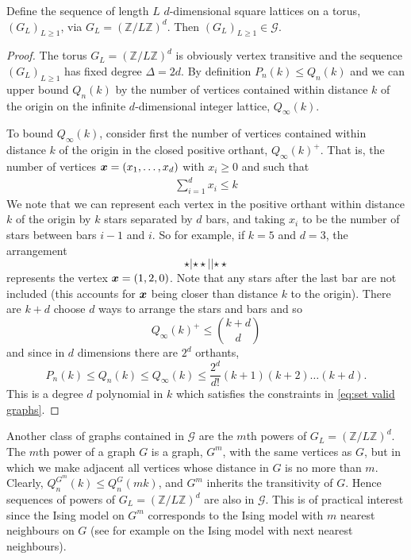 \begin{lemma}
	Define the sequence of length $L$ $d$-dimensional square lattices on a torus, $(G_L)_{L \geq 1}$, via $G_L = (\mathbb{Z}/L \mathbb{Z})^d$. Then $(G_L)_{L \geq 1} \in \mathscr{G}$.
\end{lemma}
\begin{proof}
	The torus $G_L = (\mathbb{Z}/L \mathbb{Z})^d$ is obviously vertex transitive and the sequence $(G_L)_{L \geq 1}$ has fixed degree $\Delta = 2d$. By definition $P_n(k) \leq Q_n(k)$ and we can upper bound $Q_n(k)$ by the number of vertices contained within distance $k$ of the origin on the infinite $d$-dimensional integer lattice, $Q_\infty(k)$.

	To bound $Q_\infty(k)$, consider first the number of vertices contained within distance $k$ of the origin in the closed positive orthant, $Q_\infty(k)^+$. That is, the number of vertices ${\bm{{x}}} = (x_1, \dots, x_d)$ with $x_i \geq 0$ and such that
	\begin{align}
		\sum_{i = 1}^d x_i \leq k
	\end{align}
	We note that we can represent each vertex in the positive orthant within distance $k$ of the origin by $k$ stars separated by $d$ bars, and taking $x_i$ to be the number of stars between bars $i-1$ and $i$. So for example, if $k = 5$ and $d = 3$, the arrangement
	\begin{equation}
		\star | \star \star | | \star \star
	\end{equation}
	represents the vertex ${\bm{{x}}} = (1, 2, 0)$. Note that any stars after the last bar are not included (this accounts for ${\bm{{x}}}$ being closer than distance $k$ to the origin). There are $k + d$ choose $d$ ways to arrange the stars and bars and so
	\begin{equation}
		Q_\infty(k)^+ \leq \binom{k+d}{d}
	\end{equation}
	and since in $d$ dimensions there are $2^d$ orthants,
	\begin{equation}
		P_n(k) \leq Q_n(k) \leq Q_\infty(k) \leq \frac{2^d}{d!} (k+1)(k+2)\dots(k+d).
	\end{equation}
	This is a degree $d$ polynomial in $k$ which satisfies the constraints in \eqref{eq:set valid graphs}.
\end{proof}

Another class of graphs contained in $\mathscr{G}$ are the $m$th powers of $G_L = (\mathbb{Z}/L \mathbb{Z})^d$.	The $m$th power of a graph $G$ is a graph, $G^m$, with the same vertices as $G$, but in which we make adjacent all vertices whose distance in $G$ is no more than $m$. Clearly, $Q_n^{G^m}(k) \leq Q_n^G(mk)$, and $G^m$ inherits the transitivity of $G$. Hence sequences of powers of $G_L = (\mathbb{Z}/L \mathbb{Z})^d$ are also in $\mathscr{G}$. This is of practical interest since the Ising model on $G^m$ corresponds to the Ising model with $m$ nearest neighbours on $G$ (see for example \cite{Domb1951-nb} on the Ising model with next nearest neighbours).

